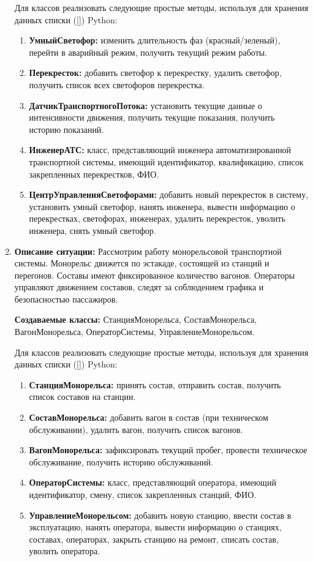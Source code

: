 \begin{enumerate}
Для классов реализовать следующие простые методы, используя для хранения данных списки ([]) Python:
\begin{enumerate}
\item \textbf{УмныйСветофор:} изменить длительность фаз (красный/зеленый), 
перейти в аварийный режим, получить текущий режим работы.
\item \textbf{Перекресток:} добавить светофор к перекрестку, удалить светофор, 
получить список всех светофоров перекрестка.
\item \textbf{ДатчикТранспортногоПотока:} установить текущие данные о интенсивности движения, 
получить текущие показания, получить историю показаний.
\item \textbf{ИнженерАТС:} класс, представляющий инженера автоматизированной транспортной системы, 
имеющий идентификатор, квалификацию, список закрепленных перекрестков, ФИО.
\item \textbf{ЦентрУправленияСветофорами:} добавить новый перекресток в систему, 
установить умный светофор, нанять инженера, вывести информацию о перекрестках, светофорах, инженерах, 
удалить перекресток, уволить инженера, снять умный светофор.
\end{enumerate}

\item
\textbf{Описание ситуации:}
Рассмотрим работу монорельсовой транспортной системы. 
Монорельс движется по эстакаде, состоящей из станций и перегонов. 
Составы имеют фиксированное количество вагонов. 
Операторы управляют движением составов, следят за соблюдением графика и безопасностью пассажиров.

\textbf{Создаваемые классы:} СтанцияМонорельса, СоставМонорельса, ВагонМонорельса, ОператорСистемы, УправлениеМонорельсом.

Для классов реализовать следующие простые методы, используя для хранения данных списки ([]) Python:
\begin{enumerate}
\item \textbf{СтанцияМонорельса:} принять состав, отправить состав, 
получить список составов на станции.
\item \textbf{СоставМонорельса:} добавить вагон в состав (при техническом обслуживании), 
удалить вагон, получить список вагонов.
\item \textbf{ВагонМонорельса:} зафиксировать текущий пробег, 
провести техническое обслуживание, получить историю обслуживаний.
\item \textbf{ОператорСистемы:} класс, представляющий оператора, 
имеющий идентификатор, смену, список закрепленных станций, ФИО.
\item \textbf{УправлениеМонорельсом:} добавить новую станцию, ввести состав в эксплуатацию, 
нанять оператора, вывести информацию о станциях, составах, операторах, закрыть станцию на ремонт, 
списать состав, уволить оператора.
\end{enumerate}


\end{enumerate}
